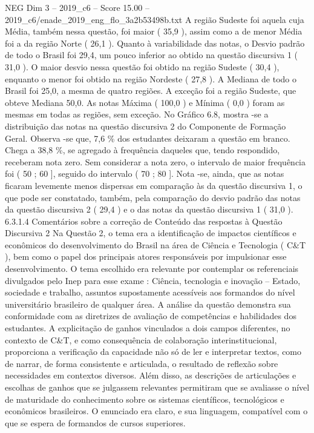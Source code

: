 \begin{textsample}{NEG Dim 3 – 2019\_c6 – Score 15.00 – 2019\_c6/enade\_2019\_eng\_flo\_3a2b53498b.txt}
A região Sudeste foi aquela cuja Média, também nessa questão, foi maior ( 35,9 ), assim como a de menor Média foi a da região Norte ( 26,1 ).
Quanto à variabilidade das notas, o Desvio padrão de todo o Brasil foi 29,4, um pouco inferior ao obtido na questão discursiva 1 ( 31,0 ).
O maior desvio nessa questão foi obtido na região Sudeste ( 30,4 ), enquanto o menor foi obtido na região Nordeste ( 27,8 ).
A Mediana de todo o Brasil foi 25,0, a mesma de quatro regiões.
A exceção foi a região Sudeste, que obteve Mediana 50,0.
As notas Máxima ( 100,0 ) e Mínima ( 0,0 ) foram as mesmas em todas as regiões, sem exceção.
No Gráfico 6.8, mostra -se a distribuição das notas na questão discursiva 2 do Componente de Formação Geral.
Observa -se que, 7,6 \% dos estudantes deixaram a questão em branco.
Chega a 38,8 \%, se agregado à frequência daqueles que, tendo respondido, receberam nota zero.
Sem considerar a nota zero, o intervalo de maior frequência foi ( 50 ; 60 ], seguido do intervalo ( 70 ; 80 ].
Nota -se, ainda, que as notas ficaram levemente menos dispersas em comparação às da questão discursiva 1, o que pode ser constatado, também, pela comparação do desvio padrão das notas da questão discursiva 2 ( 29,4 ) e o das notas da questão discursiva 1 ( 31,0 ). 6.3.1.4 Comentários sobre a correção de Conteúdo das respostas à Questão Discursiva 2 Na Questão 2, o tema era a identificação de impactos científicos e econômicos do desenvolvimento do Brasil na área de Ciência e Tecnologia ( C\&T ), bem como o papel dos principais atores responsáveis por impulsionar esse desenvolvimento.
O tema escolhido era relevante por contemplar os referenciais divulgados pelo Inep para esse exame : Ciência, tecnologia e inovação – Estado, sociedade e trabalho, assuntos supostamente acessíveis aos formandos do nível universitário brasileiro de qualquer área.
A análise da questão demonstra sua conformidade com as diretrizes de avaliação de competências e habilidades dos estudantes.
A explicitação de ganhos vinculados a dois campos diferentes, no contexto de C\&T, e como consequência de colaboração interinstitucional, proporciona a verificação da capacidade não só de ler e interpretar textos, como de narrar, de forma consistente e articulada, o resultado de reflexão sobre necessidades em contextos diversos.
Além disso, as descrições de articulações e escolhas de ganhos que se julgassem relevantes permitiram que se avaliasse o nível de maturidade do conhecimento sobre os sistemas científicos, tecnológicos e econômicos brasileiros.
O enunciado era claro, e sua linguagem, compatível com o que se espera de formandos de cursos superiores.

\end{textsample}
